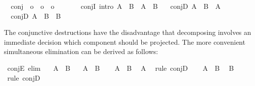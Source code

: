 \begin{isabellebody}
\isanewline
{}\isamarkupfalse%
\isanewline
\ \ conj\ {\isacharcolon}{\isacharcolon}\ {\isachardoublequoteopen}o\ {\isasymRightarrow}\ o\ {\isasymRightarrow}\ o{\isachardoublequoteclose}\ \ {\isacharparenleft}\ {\isachardoublequoteopen}{\isasymand}{\isachardoublequoteclose}\ {}{}{\isacharparenright}\ \isanewline
\ \ conjI\ {\isacharbrackleft}intro{\isacharbrackright}{\isacharcolon}\ {\isachardoublequoteopen}A\ {\isasymLongrightarrow}\ B\ {\isasymLongrightarrow}\ A\ {\isasymand}\ B{\isachardoublequoteclose}\ \isanewline
\ \ conjD\ {\isachardoublequoteopen}A\ {\isasymand}\ B\ {\isasymLongrightarrow}\ A{\isachardoublequoteclose}\ \isanewline
\ \ conjD\ {\isachardoublequoteopen}A\ {\isasymand}\ B\ {\isasymLongrightarrow}\ B{\isachardoublequoteclose}%
\begin{isamarkuptext}%
\noindent The conjunctive destructions have the disadvantage that
  decomposing  involves an immediate decision which
  component should be projected.  The more convenient simultaneous
  elimination  can be derived as
  follows:%
\end{isamarkuptext}%
\isamarkuptrue%
\isamarkupfalse%
\ conjE\ {\isacharbrackleft}elim{\isacharbrackright}{\isacharcolon}\isanewline
\ \ \ {\isachardoublequoteopen}A\ {\isasymand}\ B{\isachardoublequoteclose}\isanewline
\ \ \ A\ \ B\isanewline
%
\isadelimproof
%
\endisadelimproof
%
\isatagproof
{}\isamarkupfalse%
\isanewline
\ \ \isamarkupfalse%
\ {\isacharbackquoteopen}A\ {\isasymand}\ B{\isacharbackquoteclose}\ \isamarkupfalse%
\ A\ \isamarkupfalse%
\ {\isacharparenleft}rule\ conjD\isanewline
\ \ \isamarkupfalse%
\ {\isacharbackquoteopen}A\ {\isasymand}\ B{\isacharbackquoteclose}\ \isamarkupfalse%
\ B\ \isamarkupfalse%
\ {\isacharparenleft}rule\ conjD\isanewline
{}\isamarkupfalse%
%
\endisatagproof
{\isafoldproof}%
%

\end{isabellebody}
